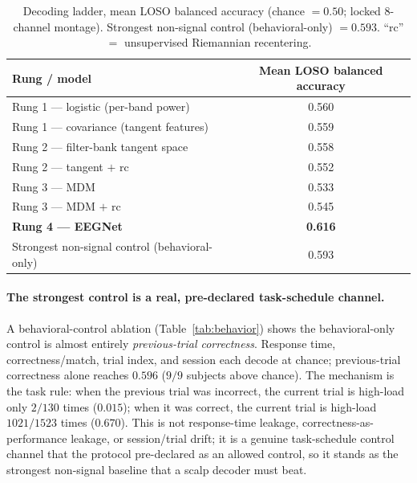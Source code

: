 \documentclass[11pt]{article}
\begin{document}
\begin{table}[h]
\centering
\caption{Decoding ladder, mean LOSO balanced accuracy (chance $=0.50$; locked 8-channel montage).
Strongest non-signal control (behavioral-only) $=0.593$. ``rc'' $=$ unsupervised Riemannian
recentering.}
\label{tab:ladder}
\begin{tabular}{lc}
\toprule
Rung / model & Mean LOSO balanced accuracy \\
\midrule
Rung 1 --- logistic (per-band power) & 0.560 \\
Rung 1 --- covariance (tangent features) & 0.559 \\
Rung 2 --- filter-bank tangent space & 0.558 \\
Rung 2 --- tangent $+$ rc & 0.552 \\
Rung 3 --- MDM & 0.533 \\
Rung 3 --- MDM $+$ rc & 0.545 \\
\textbf{Rung 4 --- EEGNet} & \textbf{0.616} \\
\midrule
Strongest non-signal control (behavioral-only) & 0.593 \\
\bottomrule
\end{tabular}
\end{table}

\paragraph{The strongest control is a real, pre-declared task-schedule channel.} A behavioral-control
ablation (Table~\ref{tab:behavior}) shows the behavioral-only control is almost entirely
\emph{previous-trial correctness}. Response time, correctness/match, trial index, and session each
decode at chance; previous-trial correctness alone reaches $0.596$ ($9/9$ subjects above chance).
The mechanism is the task rule: when the previous trial was incorrect, the current trial is high-load
only $2/130$ times ($0.015$); when it was correct, the current trial is high-load $1021/1523$ times
($0.670$). This is not response-time leakage, correctness-as-performance leakage, or session/trial
drift; it is a genuine task-schedule control channel that the protocol pre-declared as an allowed
control, so it stands as the strongest non-signal baseline that a scalp decoder must beat.
\end{document}
